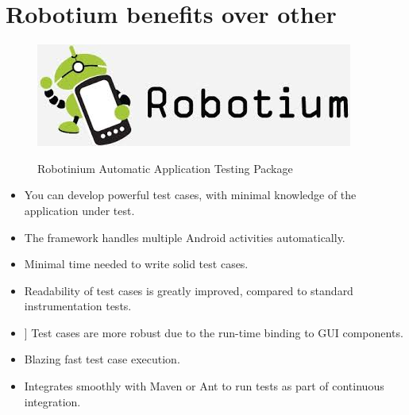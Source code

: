 \section{Robotium  benefits over other }

\begin{figure} [ht]
\centering
\includegraphics[scale=0.5]{robotinium}\\
\caption{Robotinium Automatic Application Testing Package }
\label{the-label-for-cross-referencing}
\end{figure}

\begin{itemize}
 \item You can develop powerful test cases, with minimal knowledge of the application under test.
 \item The framework handles multiple Android activities automatically.
 \item  Minimal time needed to write solid test cases.
 \item  Readability of test cases is greatly improved, compared to standard instrumentation tests.
 \item ] Test cases are more robust due to the run-time binding to GUI components.
 \item Blazing fast test case execution.
 \item Integrates smoothly with Maven or Ant to run tests as part of continuous integration.
\end{itemize}

